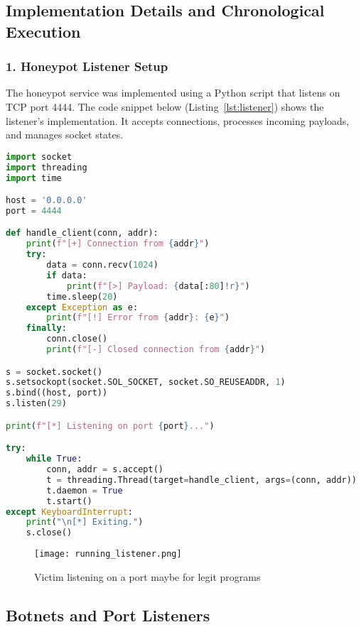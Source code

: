 \documentclass{article}
\begin{document}
\subsection*{Implementation Details and Chronological Execution}

\subsubsection*{1. Honeypot Listener Setup}
The honeypot service was implemented using a Python script that listens on TCP port 4444. The code snippet below (Listing~\ref{lst:listener}) shows the listener's implementation. It accepts connections, processes incoming payloads, and manages socket states.
\begin{lstlisting}[language=python, caption={Honeypot Listener Code (\texttt{listener\_4444.py})}, label={lst:listener}]
import socket
import threading
import time

host = '0.0.0.0'
port = 4444

def handle_client(conn, addr):
    print(f"[+] Connection from {addr}")
    try:
        data = conn.recv(1024)
        if data:
            print(f"[>] Payload: {data[:80]!r}")
        time.sleep(20)
    except Exception as e:
        print(f"[!] Error from {addr}: {e}")
    finally:
        conn.close()
        print(f"[-] Closed connection from {addr}")

s = socket.socket()
s.setsockopt(socket.SOL_SOCKET, socket.SO_REUSEADDR, 1)
s.bind((host, port))
s.listen(29)

print(f"[*] Listening on port {port}...")

try:
    while True:
        conn, addr = s.accept()
        t = threading.Thread(target=handle_client, args=(conn, addr))
        t.daemon = True
        t.start()
except KeyboardInterrupt:
    print("\n[*] Exiting.")
    s.close()
\end{lstlisting}

\begin{figure}[h!]
    \centering
    \texttt{[image: running\_listener.png]}
    \caption{Victim listening on a port maybe for legit programs}
\end{figure}
\subsection*{Botnets and Port Listeners}
\end{document}
